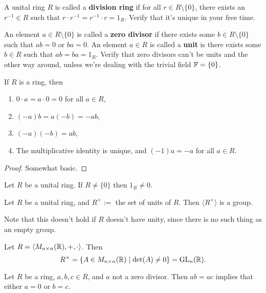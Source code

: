 \begin{definition}
    A unital ring $R$ is called a \textbf{division ring} if for all $r\in R\setminus \{0\} $, there exists an $r^{-1}\in R$ such that $r\cdot r^{-1}=r^{-1}\cdot r=1_R$. Verify that it's unique in your free time.
\end{definition}
\begin{definition}
    An element $a\in R\setminus \{0\} $ is called a \textbf{zero divisor} if there exists some $b\in R\setminus \{0\} $ such that $ab=0$ or $ba=0$. An element $a\in R$ is called a \textbf{unit} is there exists some $b\in R$ such that $ab=ba=1_R$. Verify that zero divisors can't be units and the other way around, unless we're dealing with the trivial field $\mathbb{F}=\{0\} $.
\end{definition}
\begin{prop}
    If $R$ is a ring, then
    \begin{enumerate}
        \item $0\cdot a=a\cdot 0=0$ for all $a\in R$,
        \item $(-a)b=a(-b)=-ab$,
        \item $(-a)(-b)=ab$,
        \item The multiplicative identity is unique, and $(-1)a=-a$ for all $a\in R$.
    \end{enumerate}
\end{prop}
\begin{proof}
    Somewhat basic.
\end{proof}
\begin{cor}
    Let $R$ be a unital ring. If $R\neq \{0\} $ then $1_R\neq 0$.
\end{cor}
\begin{lemma}
Let $R$ be a unital ring, and $R^{\times }:=$ the set of units of $R$. Then $\langle R^{\times } \rangle $ is a group.
\end{lemma}
Note that this doesn't hold if $R$ doesn't have unity, since there is no such thing as an empty group.
\begin{example}
    Let $R=\langle M_{n\times n}(\mathbb{R}),+,\cdot  \rangle $. Then \[
        R^{\times }=\{A\in M_{n\times n}(\mathbb{R})  \mid \det (A)\neq 0\} =\operatorname{GL}_n(\mathbb{R}).
    \] 
\end{example}
\begin{lemma}\label{lc}
    Let $R$ be a ring, $a,b,c\in R$, and $a$ not a zero divisor. Then $ab=ac$ implies that either $a=0$ or $b=c$.
\end{lemma}
